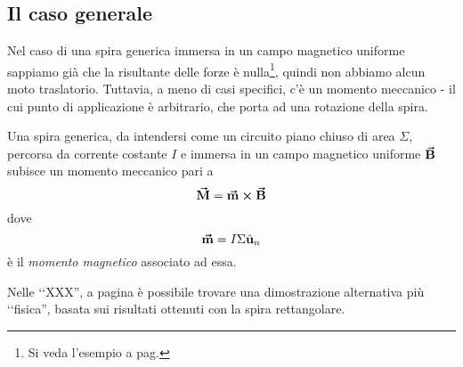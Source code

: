 \subsection{Il caso generale}
Nel caso di una spira generica immersa in un campo magnetico uniforme sappiamo già che la risultante delle forze è nulla\footnote{Si veda l'esempio a pag. \pageref{RisultateSpiraNulla}}, quindi non abbiamo alcun moto traslatorio. Tuttavia, a meno di casi specifici, c'è un momento meccanico - il cui punto di applicazione è arbitrario, che porta ad una rotazione della spira.
\begin{theorema}
	Una spira generica, da intendersi come un circuito piano chiuso di area $\Sigma$, percorsa da corrente costante $I$ e immersa in un campo magnetico uniforme $\vb*{\va{B}}$ subisce un momento meccanico pari a
	\begin{equation}
		\vb*{\va{M}}=\vb*{\va{m}}\cross\vb*{\va{B}}
	\end{equation}
	dove
	\begin{equation}
		\vb*{\va{m}}=I\Sigma\hat{\mathbf{u}}_n
	\end{equation}
	è il \textit{momento magnetico} associato ad essa.
\end{theorema}
\begin{observe}
	Nelle ‘‘XXX'', a pagina \pageref{XXX} è possibile trovare una dimostrazione alternativa più ‘‘fisica'', basata sui risultati ottenuti con la spira rettangolare.
\end{observe}
